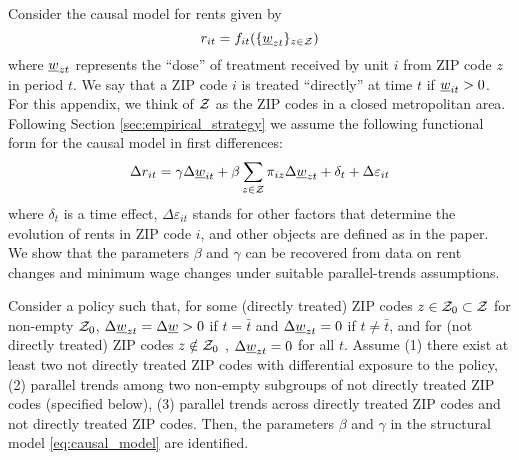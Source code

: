 Consider the causal model for rents given by
$$r_{it}=f_{it}(\{\underline{w}_{zt}\}_{z\in\mathcal{Z}})$$
where $\underline{w}_{zt}$ represents the ``dose'' of treatment received by unit $i$ from
ZIP code $z$ in period $t$.
We say that a ZIP code $i$ is treated ``directly'' at time $t$ if $\underline{w}_{it}>0$.
For this appendix, we think of $\mathcal{Z}$ as the ZIP codes in a closed metropolitan 
area. 
Following Section \ref{sec:empirical_strategy} we assume the following functional
form for the causal model in first differences:
\begin{equation}\label{eq:causal_model}
    \Delta r_{it} = \gamma \Delta \underline{w}_{it} 
                  + \beta \sum_{z\in\mathcal{Z}} \pi_{iz} \Delta \underline{w}_{zt}
                  + \delta_t + \Delta \varepsilon_{it}
\end{equation}
where $\delta_t$ is a time effect,
$\Delta \varepsilon_{it}$ stands for other factors that determine the evolution
of rents in ZIP code $i$, and
other objects are defined as in the paper.
We show that the parameters $\beta$ and $\gamma$ can be recovered from data on 
rent changes and minimum wage changes under suitable parallel-trends 
assumptions.

\begin{prop}[Identification]\label{prop:did_id}
    Consider a policy such that, 
    for some (directly treated) ZIP codes  $z\in\mathcal{Z}_0\subset\mathcal{Z}$ for non-empty $\mathcal{Z}_0$,
        $\Delta\underline{w}_{zt}=\Delta\underline{w}>0$ if $t=\bar{t}$ and
        $\Delta\underline{w}_{zt}=0$           if $t\neq\bar{t}$,
    and for (not directly treated) ZIP codes $z\notin\mathcal{Z}_0$ ,
        $\Delta\underline{w}_{zt}=0$ for all $t$.
    Assume
    (1) there exist at least two not directly treated ZIP codes with differential 
    exposure to the policy, 
    (2) parallel trends among two non-empty subgroups of not directly treated 
    ZIP codes (specified below),
    (3) parallel trends across directly treated ZIP codes and not directly 
    treated ZIP codes.
    Then, the parameters $\beta$ and $\gamma$ in the structural model 
    \ref{eq:causal_model} are identified.
\end{prop}

